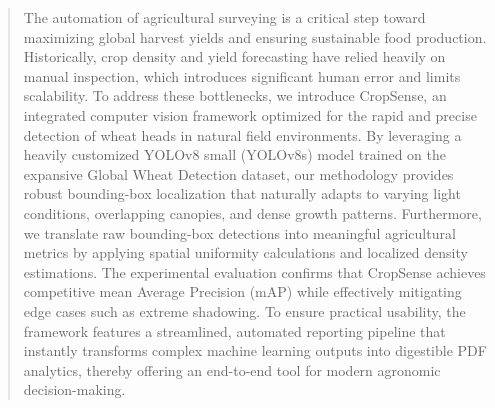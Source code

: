 \begin{abstract}
The automation of agricultural surveying is a critical step toward maximizing global harvest yields and ensuring sustainable food production. Historically, crop density and yield forecasting have relied heavily on manual inspection, which introduces significant human error and limits scalability. To address these bottlenecks, we introduce CropSense, an integrated computer vision framework optimized for the rapid and precise detection of wheat heads in natural field environments. By leveraging a heavily customized YOLOv8 small (YOLOv8s) model trained on the expansive Global Wheat Detection dataset, our methodology provides robust bounding-box localization that naturally adapts to varying light conditions, overlapping canopies, and dense growth patterns. Furthermore, we translate raw bounding-box detections into meaningful agricultural metrics by applying spatial uniformity calculations and localized density estimations. The experimental evaluation confirms that CropSense achieves competitive mean Average Precision (mAP) while effectively mitigating edge cases such as extreme shadowing. To ensure practical usability, the framework features a streamlined, automated reporting pipeline that instantly transforms complex machine learning outputs into digestible PDF analytics, thereby offering an end-to-end tool for modern agronomic decision-making.
\end{abstract}